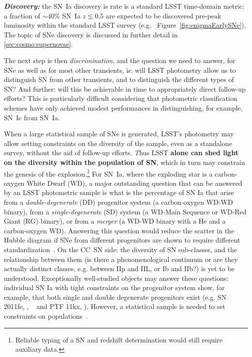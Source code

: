 {\bf \emph{Discovery:}} the SN~Ia discovery is rate is a standard LSST time-domain metric: a
fraction of $\sim40\%$ SN~Ia $z\lesssim0.5$ are expected to be discovered pre-peak
luminosity within the standard LSST survey
(e.g. ~Figure~\ref{fig:enigmaEarlySNe}). The
topic of SNe discovery is discussed in further detail in
\autoref{sec:cosmo:supernovae}.

The next step is then {\emph{discrimination}}, and the question we need
to answer, for SNe as well as for most other transients, is: will LSST
photometry allow us to distinguish SN from other transients, and to
distinguish the different types of SN? And further: will this be
achievable in time to appropriately direct follow-up efforts? This is
particularly difficult considering that photometric classification
schemes have only achieved modest performances in distinguishing, for
example, SN~Ic from SN~Ia. 

When a large statistical sample of SNe is generated, LSST's photometry
may allow setting constraints on the diversity of the sample, even as a
standalone survey, without the aid of follow-up efforts.  {\emph Thus
  LSST \bf{alone} can shed light on the diversity within the
  population of SN}, which in turn may constrain the genesis of the
explosion.\footnote{Reliable typing of a SN and redshift determination
  would still require auxiliary data.} For SN~Ia, where the exploding
star is a carbon-oxygen White Dwarf (WD), a major outstanding question
that can be answered by an LSST photometric sample is
what is the percentage of SN Ia that arise from a
\emph{double-degenerate} (DD) progenitor system (a carbon-oxygen WD-WD
binary), from a \emph {single-degenerate} (SD) system (a WD-Main Sequence
 or WD-Red Giant (RG) binary), or from a \emph{merger} (a WD-WD
 binary with a He and a carbon-oxygen WD).
 Answering this question would reduce the
scatter in the Hubble diagram if SNe from different progenitors are
shown to require different standardization~\citep{Scolnic2014}. On the
CC~SN side: the diversity of SN sub-classes, and the relationship
between them (is there a phenomenological continuum or are they actually
distinct classes, e.g. between IIp and IIL, or Ib and IIb?) is yet to
be understood. Exceptionally well-studied objects may answer these
questions: individual SN Ia with tight constraints on the progenitor
system show, for example, that both single and double degenerate
progenitors exist (e.g. SN 2011fe, \citealt{Li11}, ~\citealt{Olling15}
and PTF 11kx, \citealt{Dilday12}). However, a statistical sample is
needed to set constraints on populations~\citep{Hayden2010, Bianco11}.


